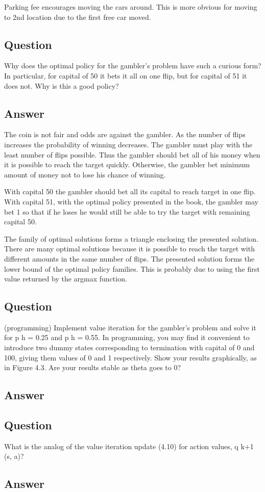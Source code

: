 \documentclass[11pt]{article}
\begin{document}
    Parking fee encourages moving the cars around.
    This is more obvious for moving to 2nd location due to the first free car moved.

    \subsection{Question}

    Why does the optimal policy for the gambler’s problem have such a curious form?
    In particular, for capital of 50 it bets it all on one flip, but for capital of 51 it does not.
    Why is this a good policy?

    \subsection*{Answer}

    The coin is not fair and odds are against the gambler.
    As the number of flips increases the probability of winning decreases.
    The gambler must play with the least number of flips possible.
    Thus the gambler should bet all of his money when it is possible to reach the target quickly.
    Otherwise, the gambler bet minimum amount of money not to lose his chance of winning.

    With capital 50 the gambler should bet all its capital to reach target in one flip.
    With capital 51, with the optimal policy presented in the book, the gambler may bet 1 so that if he loses he would still be able to try the target with remaining capital 50.

    The family of optimal solutions forms a triangle enclosing the presented solution.
    There are many optimal solutions because it is possible to reach the target with different amounts in the same number of flips.
    The presented solution forms the lower bound of the optimal policy families.
    This is probably due to using the first value returned by the argmax function.


    \subsection{Question}

    (programming) Implement value iteration for the gambler’s problem and solve it for p h = 0.25 and p h = 0.55.
    In programming, you may find it convenient to introduce two dummy states corresponding to termination with capital of 0 and 100, giving them values of 0 and 1 respectively.
    Show your results graphically, as in Figure 4.3.
    Are your results stable as theta goes to 0?

    \subsection*{Answer}

    \subsection{Question}

    What is the analog of the value iteration update (4.10) for action values, q k+1 (s, a)?

    \subsection*{Answer}
    
\end{document}

